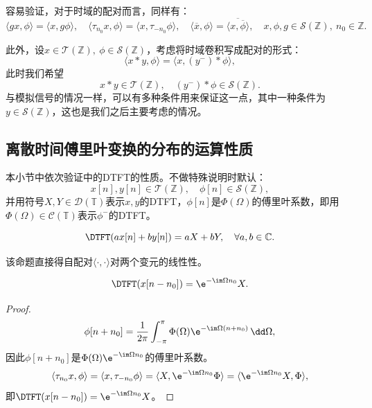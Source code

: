 容易验证，对于时域的配对而言，同样有：
\begin{equation}
    \langle gx,\phi\rangle=\langle x,g\phi\rangle,\quad \langle \tau_{n_0}x,\phi\rangle=\langle x,\tau_{-n_0}\phi\rangle,\quad \langle \overline{x},\phi\rangle=\overline{\langle x,\overline{\phi}\rangle},\quad x,\phi,g\in\mathcal{S}(\mathbb{Z}),\ n_0\in\mathbb{Z}.
\end{equation}

此外，设$x\in\mathcal{T}(\mathbb{Z}),\ \phi\in\mathcal{S}(\mathbb{Z})$，考虑将时域卷积写成配对的形式：
\begin{equation}
    \langle x*y,\phi\rangle=\langle x,(y^-)*\phi\rangle,
\end{equation}
此时我们希望
\begin{equation}
    x*y\in\mathcal{T}(\mathbb{Z}),\quad (y^-)*\phi\in\mathcal{S}(\mathbb{Z}).
\end{equation}
与模拟信号的情况一样，可以有多种条件用来保证这一点，其中一种条件为$y\in\mathcal{S}(\mathbb{Z})$，这也是我们之后主要考虑的情况。

\subsection{离散时间傅里叶变换的分布的运算性质}\label{sub:DTFT_distribution_operation}

本小节中依次验证中的DTFT的性质。不做特殊说明时默认：
\begin{equation}
    x[n],y[n]\in\mathcal{T}(\mathbb{Z}),\quad \phi[n]\in\mathcal{S}(\mathbb{Z}),
\end{equation}
并用符号$X,Y\in\mathcal{D}(\mathbb{T})$表示$x,y$的DTFT，$\phi[n]$是$\Phi(\Omega)$的傅里叶系数，即用$\Phi(\Omega)\in\mathcal{C}(\mathbb{T})$表示$\phi^-$的DTFT。

\begin{proposition}[线性性]
    \begin{equation}
        \DTFT(ax[n]+by[n])=aX+bY,\quad \forall a,b\in\mathbb{C}.
    \end{equation}
\end{proposition}
该命题直接得自配对$\langle\cdot,\cdot\rangle$对两个变元的线性性。

\begin{proposition}[时移性质]
    \begin{equation}
        \DTFT(x[n-n_0])=\e^{-\im \Omega n_0}X.
    \end{equation}
\end{proposition}
\begin{proof}
    \begin{equation}
        \phi[n+n_0]=\frac{1}{2\pi}\int_{-\pi}^{\pi}\Phi(\Omega)\e^{-\im\Omega (n+n_0)}\,\dd\Omega,
    \end{equation}
    因此$\phi[n+n_0]$是$\Phi(\Omega)\e^{-\im\Omega n_0}$的傅里叶系数。
    \begin{equation}
        \langle \tau_{n_0}x,\phi\rangle=\langle x,\tau_{-n_0}\phi\rangle=\langle X,\e^{-\im\Omega n_0}\Phi\rangle=\langle\e^{-\im \Omega n_0}X,\Phi\rangle,
    \end{equation}
    即$\DTFT(x[n-n_0])=\e^{-\im \Omega n_0}X$。
\end{proof}

